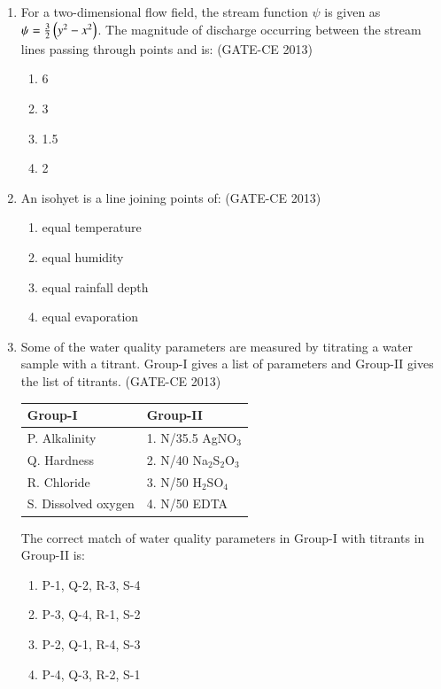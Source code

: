 \documentclass[journal,12pt,onecolumn]{article}
\theoremstyle{remark}
\begin{document}
\begin{enumerate}
    \item For a two-dimensional flow field, the stream function $\psi$ is given as $\psi = \frac{3}{2} \left(y^2 - x^2\right)$. The magnitude of discharge occurring between the stream lines passing through points  and  is: (GATE-CE 2013)
    \begin{multicols}{4}
    \begin{enumerate}
        \item 6 
        \item 3 
        \item 1.5 
        \item 2
    \end{enumerate}
    \end{multicols}
    
    \item An isohyet is a line joining points of: (GATE-CE 2013)
    \begin{multicols}{2}
    \begin{enumerate}
        \item equal temperature 
        \item equal humidity 
        \item equal rainfall depth 
        \item equal evaporation
    \end{enumerate}
    \end{multicols}
    
    \item Some of the water quality parameters are measured by titrating a water sample with a titrant. Group-I gives a list of parameters and Group-II gives the list of titrants. (GATE-CE 2013)

    \begin{table}[H]
    \centering
    \begin{tabular}{|l|l|}
    \hline
    \textbf{Group-I} & \textbf{Group-II} \\
    \hline
    P. Alkalinity & 1. N/35.5 AgNO$_3$ \\
    Q. Hardness & 2. N/40 Na$_2$S$_2$O$_3$ \\
    R. Chloride & 3. N/50 H$_2$SO$_4$ \\
    S. Dissolved oxygen & 4. N/50 EDTA \\
    \hline
    \end{tabular}
    \end{table}
    
    The correct match of water quality parameters in Group-I with titrants in Group-II is:
    \begin{enumerate}
        \item P-1, Q-2, R-3, S-4 
        \item P-3, Q-4, R-1, S-2 
        \item P-2, Q-1, R-4, S-3 
        \item P-4, Q-3, R-2, S-1
    \end{enumerate}
    

\end{enumerate}
\end{document}
